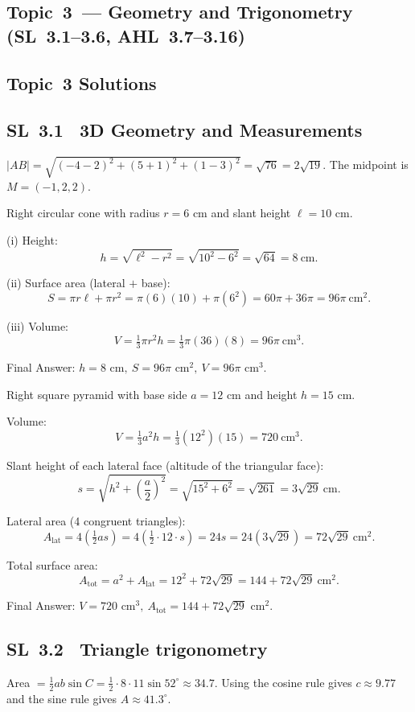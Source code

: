 \documentclass[11pt]{article}
\def\textbf#1{#1}%
\newcommand{\tocsubsection}[1]{\subsection{#1}}
\begin{document}
\tocsubsection{Topic 3 — Geometry and Trigonometry (SL 3.1–3.6, AHL 3.7–3.16)}



\tocsubsection{Topic 3 Solutions}
\tocsubsection{SL 3.1 \; 3D Geometry and Measurements}

\begin{solution}
\(|AB|=\sqrt{(-4-2)^2+(5+1)^2+(1-3)^2}=\sqrt{76}=2\sqrt{19}\).  The midpoint
is $M=(-1,2,2)$.
\end{solution}


\begin{solution}
Right circular cone with radius \(r=6\) cm and slant height \(\ell=10\) cm.

(i) Height:
\[
h=\sqrt{\ell^{2}-r^{2}}=\sqrt{10^{2}-6^{2}}=\sqrt{64}= \boxed{8\ \text{cm}}.
\]

(ii) Surface area (lateral \(+\) base):
\[
S=\pi r\ell+\pi r^{2}= \pi(6)(10)+\pi(6^{2})=60\pi+36\pi=\boxed{96\pi\ \text{cm}^{2}}.
\]

(iii) Volume:
\[
V=\tfrac13\pi r^{2}h=\tfrac13\pi(36)(8)=\boxed{96\pi\ \text{cm}^{3}}.
\]

\textbf{Final Answer:} \(h=8\text{ cm},\ S=96\pi\text{ cm}^2,\ V=96\pi\text{ cm}^3.\)
\end{solution}

\begin{solution}
Right square pyramid with base side \(a=12\) cm and height \(h=15\) cm.

Volume:
\[
V=\tfrac13 a^{2}h=\tfrac13(12^{2})(15)=\boxed{720\ \text{cm}^{3}}.
\]

Slant height of each lateral face (altitude of the triangular face):
\[
s=\sqrt{h^{2}+\left(\frac{a}{2}\right)^{2}}
=\sqrt{15^{2}+6^{2}}=\sqrt{261}= \boxed{3\sqrt{29}\ \text{cm}}.
\]

Lateral area (4 congruent triangles):
\[
A_{\text{lat}}=4\left(\tfrac12 a s\right)=4\left(\tfrac12\cdot12\cdot s\right)=24s
=24(3\sqrt{29})=\boxed{72\sqrt{29}\ \text{cm}^{2}}.
\]

Total surface area:
\[
A_{\text{tot}}=a^{2}+A_{\text{lat}}=12^{2}+72\sqrt{29}
=\boxed{144+72\sqrt{29}\ \text{cm}^{2}}.
\]

\textbf{Final Answer:} \(V=720\text{ cm}^{3},\ A_{\text{tot}}=144+72\sqrt{29}\text{ cm}^{2}.\)
\end{solution}



\tocsubsection{SL 3.2 \; Triangle trigonometry}

\begin{solution}
Area $=\tfrac12 ab\sin C=\tfrac12\cdot8\cdot11\sin52^{\circ}\approx34.7$.
Using the cosine rule gives $c\approx9.77$ and the sine rule gives
$A\approx41.3^{\circ}$.
\end{solution}
\end{document}
